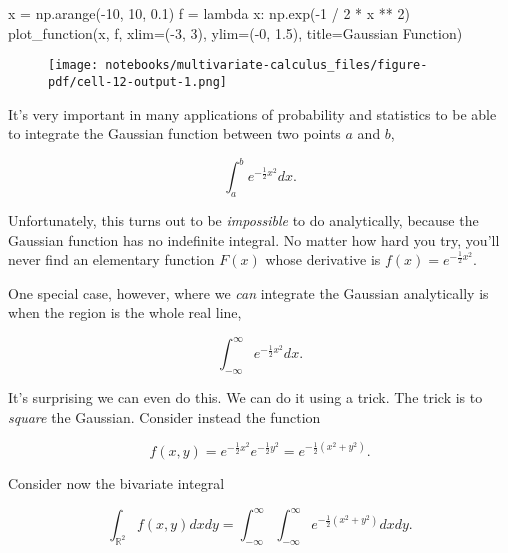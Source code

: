 \documentclass[
  letterpaper,
  DIV=11,
  numbers=noendperiod]{scrreprt}
\newenvironment{Shaded}{\begin{snugshade}}{\end{snugshade}}
\newcommand{\DecValTok}[1]{\textcolor[rgb]{0.68,0.00,0.00}{#1}}
\newcommand{\FloatTok}[1]{\textcolor[rgb]{0.68,0.00,0.00}{#1}}
\newcommand{\KeywordTok}[1]{\textcolor[rgb]{0.00,0.23,0.31}{#1}}
\newcommand{\NormalTok}[1]{\textcolor[rgb]{0.00,0.23,0.31}{#1}}
\newcommand{\OperatorTok}[1]{\textcolor[rgb]{0.37,0.37,0.37}{#1}}
\newcommand{\StringTok}[1]{\textcolor[rgb]{0.13,0.47,0.30}{#1}}
\begin{document}
\begin{Shaded}
\begin{Highlighting}[]
\NormalTok{x }\OperatorTok{=}\NormalTok{ np.arange(}\OperatorTok{{-}}\DecValTok{10}\NormalTok{, }\DecValTok{10}\NormalTok{, }\FloatTok{0.1}\NormalTok{)}
\NormalTok{f }\OperatorTok{=} \KeywordTok{lambda}\NormalTok{ x:  np.exp(}\OperatorTok{{-}}\DecValTok{1} \OperatorTok{/} \DecValTok{2} \OperatorTok{*}\NormalTok{ x }\OperatorTok{**} \DecValTok{2}\NormalTok{)}
\NormalTok{plot\_function(x, f, xlim}\OperatorTok{=}\NormalTok{(}\OperatorTok{{-}}\DecValTok{3}\NormalTok{, }\DecValTok{3}\NormalTok{), ylim}\OperatorTok{=}\NormalTok{(}\OperatorTok{{-}}\DecValTok{0}\NormalTok{, }\FloatTok{1.5}\NormalTok{), title}\OperatorTok{=}\StringTok{\textquotesingle{}Gaussian Function\textquotesingle{}}\NormalTok{)}
\end{Highlighting}
\end{Shaded}

\begin{figure}[H]

{\centering \texttt{[image: notebooks/multivariate-calculus\_files/figure-pdf/cell-12-output-1.png]}

}

\end{figure}

It's very important in many applications of probability and statistics
to be able to integrate the Gaussian function between two points \(a\)
and \(b\),

\[\int_a^b e^{-\frac{1}{2} x^2} dx.\]

Unfortunately, this turns out to be \emph{impossible} to do
analytically, because the Gaussian function has no indefinite integral.
No matter how hard you try, you'll never find an elementary function
\(F(x)\) whose derivative is \(f(x)=e^{-\frac{1}{2} x^2}\).

One special case, however, where we \emph{can} integrate the Gaussian
analytically is when the region is the whole real line,

\[\int_{-\infty}^\infty e^{-\frac{1}{2} x^2} dx.\]

It's surprising we can even do this. We can do it using a trick. The
trick is to \emph{square} the Gaussian. Consider instead the function

\[f(x,y) = e^{-\frac{1}{2} x^2} e^{-\frac{1}{2} y^2} = e^{-\frac{1}{2} (x^2+y^2)}.\]

Consider now the bivariate integral

\[\int_{\mathbb{R}^2} f(x,y) dxdy = \int_{-\infty}^\infty \int_{-\infty}^\infty e^{-\frac{1}{2} (x^2+y^2)} dxdy.\]
\end{document}
